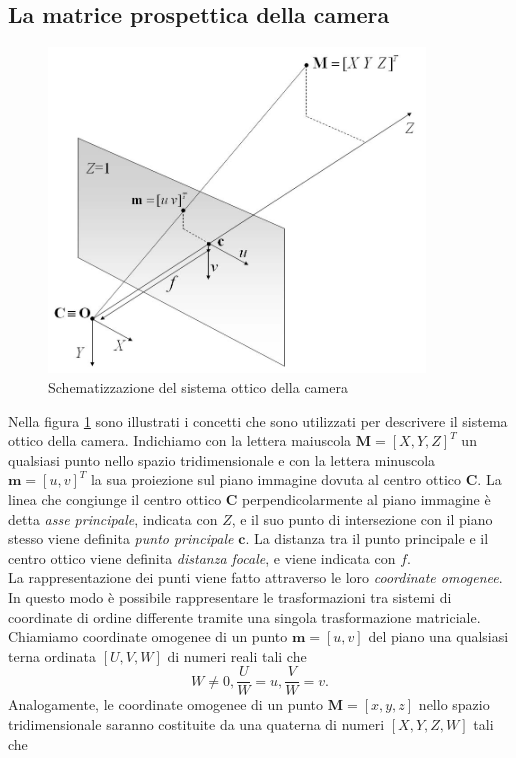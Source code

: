 \subsection{La matrice prospettica della camera}
\begin{figure}[tb]
	\centering
	\includegraphics[width=10cm]{./pictures/modelloCamera}
	\caption{Schematizzazione del sistema ottico della camera}
	\label{fig:modelloCamera}
\end{figure} 
Nella figura \ref{fig:modelloCamera} sono illustrati i concetti che sono utilizzati per descrivere il sistema ottico della camera.
Indichiamo con la lettera maiuscola $\textbf{M}=[X, Y, Z]^\textit{T}$ un qualsiasi punto nello spazio tridimensionale e con la lettera minuscola $\textbf{m} = [u, v]^\textit{T}$ la sua proiezione sul piano immagine dovuta al centro ottico $\textbf{C}$.
La linea che congiunge il centro ottico $\textbf{C}$ perpendicolarmente al piano immagine \`e detta \textit{asse principale}, indicata con $Z$, e il suo punto di intersezione con il piano stesso viene definita \textit{punto principale} $\textbf{c}$.
La distanza tra il punto principale e il centro ottico viene definita \textit{distanza focale},  e viene indicata con $f$.\\
La rappresentazione dei punti viene fatto attraverso le loro \textit{coordinate omogenee}.
In questo modo \`e possibile rappresentare le trasformazioni tra sistemi di coordinate di ordine differente tramite una singola trasformazione matriciale.
Chiamiamo coordinate omogenee di un punto $\textbf{m} = [u,v]$ del piano una qualsiasi terna ordinata $[U,V,W]$ di numeri reali tali che
\[W\neq 0,
\frac{U}{W}=u,
\frac{V}{W}=v.\]
Analogamente, le coordinate omogenee di un punto $\textbf{M}=[x,y,z]$ nello spazio tridimensionale saranno costituite da una quaterna di numeri $[X,Y,Z,W]$ tali che 
